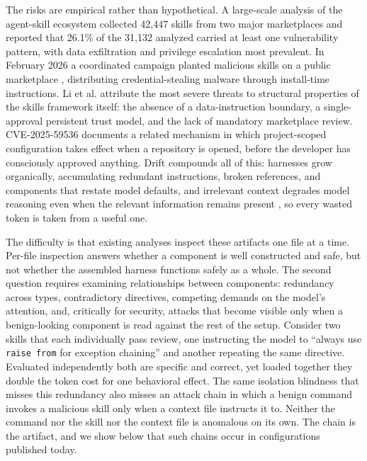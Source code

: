 \documentclass[conference]{IEEEtran}
\begin{document}
The risks are empirical rather than hypothetical. A large-scale analysis of the
agent-skill ecosystem \cite{liu2026wild} collected 42{,}447 skills from two
major marketplaces and reported that 26.1\% of the 31{,}132 analyzed carried at
least one vulnerability pattern, with data exfiltration and privilege escalation
most prevalent. In February 2026 a coordinated campaign planted malicious skills
on a public marketplace \cite{yomtov2026clawhavoc}, distributing
credential-stealing malware through install-time instructions. Li et al.
\cite{li2026securing} attribute the most severe threats to structural properties
of the skills framework itself: the absence of a data-instruction boundary, a
single-approval persistent trust model, and the lack of mandatory marketplace
review. CVE-2025-59536 \cite{cve202559536} documents a related mechanism in
which project-scoped configuration takes effect when a repository is opened,
before the developer has consciously approved anything. Drift compounds all of
this: harnesses grow organically, accumulating redundant instructions, broken
references, and components that restate model defaults, and irrelevant context
degrades model reasoning even when the relevant information remains present
\cite{shi2023distracted}, so every wasted token is taken from a useful one.

The difficulty is that existing analyses inspect these artifacts one file at a
time. Per-file inspection answers whether a component is well constructed and
safe, but not whether the assembled harness functions safely as a whole. The
second question requires examining relationships between components: redundancy
across types, contradictory directives, competing demands on the model's
attention, and, critically for security, attacks that become visible only when a
benign-looking component is read against the rest of the setup. Consider two
skills that each individually pass review, one instructing the model to ``always
use \texttt{raise from} for exception chaining'' and another repeating the same
directive. Evaluated independently both are specific and correct, yet loaded
together they double the token cost for one behavioral effect. The same
isolation blindness that misses this redundancy also misses an attack chain in
which a benign command invokes a malicious skill only when a context file
instructs it to. Neither the command nor the skill nor the context file is
anomalous on its own. The chain is the artifact, and we show below that such
chains occur in configurations published today.
\end{document}
